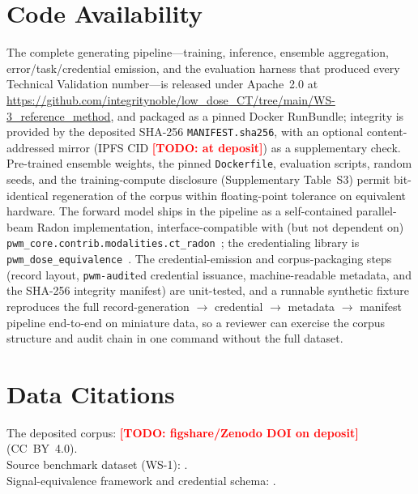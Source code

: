 \documentclass{article}
\newcommand{\todo}[1]{\textcolor{red}{\textbf{[TODO: #1]}}}
\newcommand{\datadoi}{\todo{figshare/Zenodo DOI on deposit}}
\begin{document}
\section{Code Availability}
\label{sec:codeavail}

The complete generating pipeline---training, inference, ensemble
aggregation, error/task/credential emission, and the evaluation harness
that produced every Technical Validation number---is released under
Apache~2.0 at
\url{https://github.com/integritynoble/low_dose_CT/tree/main/WS-3_reference_method},
and packaged as a pinned Docker RunBundle; integrity is provided by the
deposited SHA-256 \texttt{MANIFEST.sha256}, with an optional
content-addressed mirror (IPFS CID \todo{at deposit}) as a supplementary
check. Pre-trained ensemble weights,
the pinned \texttt{Dockerfile}, evaluation scripts, random seeds, and the
training-compute disclosure (Supplementary Table~S3) permit bit-identical
regeneration of the corpus within floating-point tolerance on equivalent
hardware. The forward model ships in the pipeline as a self-contained
parallel-beam Radon implementation, interface-compatible with (but not
dependent on) \texttt{pwm\_core.contrib.modalities.ct\_radon}~\citep{pwmcore}; the
credentialing library is \texttt{pwm\_dose\_equivalence}~\citep{ws2framework}.
The credential-emission and corpus-packaging steps (record layout,
\texttt{pwm-audit}ed credential issuance, machine-readable metadata, and the
SHA-256 integrity manifest) are unit-tested, and a runnable synthetic fixture
reproduces the full record-generation $\rightarrow$ credential $\rightarrow$
metadata $\rightarrow$ manifest pipeline end-to-end on miniature data, so a
reviewer can exercise the corpus structure and audit chain in one command
without the full dataset.

\section*{Data Citations}
\noindent
The deposited corpus: \datadoi{} (CC~BY~4.0).\\
Source benchmark dataset (WS-1): \citet{ws1dataset}.\\
Signal-equivalence framework and credential schema: \citet{ws2framework}.

\end{document}
